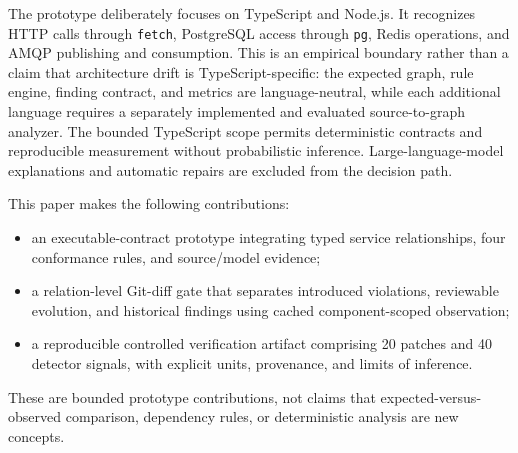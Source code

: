 The prototype deliberately focuses on TypeScript and Node.js. It recognizes HTTP calls through \texttt{fetch}, PostgreSQL access through \texttt{pg}, Redis operations, and AMQP publishing and consumption. This is an empirical boundary rather than a claim that architecture drift is TypeScript-specific: the expected graph, rule engine, finding contract, and metrics are language-neutral, while each additional language requires a separately implemented and evaluated source-to-graph analyzer. The bounded TypeScript scope permits deterministic contracts and reproducible measurement without probabilistic inference. Large-language-model explanations and automatic repairs are excluded from the decision path.

This paper makes the following contributions:
\begin{itemize}
  \item an executable-contract prototype integrating typed service relationships, four conformance rules, and source/model evidence;
  \item a relation-level Git-diff gate that separates introduced violations, reviewable evolution, and historical findings using cached component-scoped observation;
  \item a reproducible controlled verification artifact comprising 20 patches and 40 detector signals, with explicit units, provenance, and limits of inference.
\end{itemize}
These are bounded prototype contributions, not claims that expected-versus-observed comparison, dependency rules, or deterministic analysis are new concepts.
